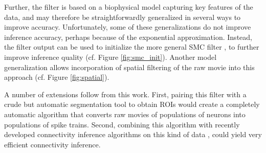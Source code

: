 Further, the \foopsi filter is based on a biophysical model capturing key features of the data, and may therefore be straightforwardly generalized in several ways to improve accuracy.  Unfortunately, some of these generalizations do not improve inference accuracy, perhaps because of the exponential approximation.  Instead, the \foopsi filter output can be used to initialize the more general SMC filter \cite{VogelsteinPaninski09}, to further improve inference quality (cf. Figure \ref{fig:smc_init}).  Another model generalization allows incorporation of spatial filtering of the raw movie into this approach (cf. Figure \ref{fig:spatial}).  %

A number of extensions follow from this work.  First, pairing this filter with a crude but automatic segmentation tool to obtain ROIs would create a completely automatic algorithm that converts raw movies of populations of neurons into populations of spike trains.  Second, combining this algorithm with recently developed connectivity inference algorithms on this kind of data \cite{MishchenkoPaninski09}, could yield very efficient connectivity inference.